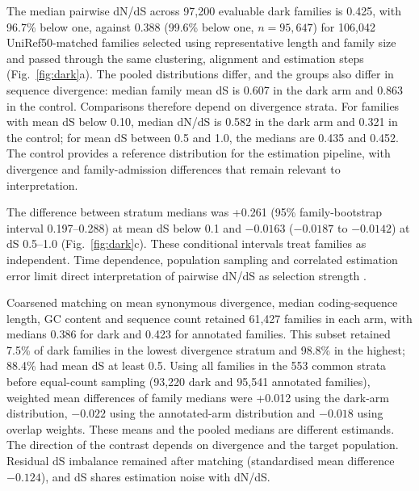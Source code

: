 \documentclass[11pt]{article}
\begin{document}
The median pairwise dN/dS across 97{,}200 evaluable dark families is 0.425, with 96.7\%
below one, against 0.388 (99.6\% below one, $n = 95{,}647$) for 106{,}042 UniRef50-matched families
selected using representative length and family size and passed through the same clustering,
alignment and estimation steps (Fig.~\ref{fig:dark}a). The pooled distributions differ, and the groups also differ in sequence divergence: median
family mean dS is 0.607 in the dark arm and 0.863 in the control. Comparisons therefore depend
on divergence strata. For families with mean dS below 0.10, median dN/dS is 0.582 in the dark
arm and 0.321 in the control; for mean dS between 0.5 and 1.0, the medians are 0.435 and 0.452.
The control provides a reference distribution for the estimation pipeline, with divergence and
family-admission differences that remain relevant to interpretation.

The difference between stratum medians was +0.261 (95\% family-bootstrap interval
0.197--0.288) at mean dS below 0.1 and $-0.0163$ ($-0.0187$ to $-0.0142$) at dS 0.5--1.0
(Fig.~\ref{fig:dark}c). These conditional intervals treat families as independent.
Time dependence, population sampling and correlated estimation error limit direct interpretation
of pairwise dN/dS as selection strength \citep{kryazhimskiy2008dnds,mugal2014time}.

Coarsened matching on mean synonymous divergence, median coding-sequence length, GC content
and sequence count retained 61{,}427 families in each arm, with medians 0.386 for dark and 0.423 for annotated families.
This subset retained 7.5\% of dark families in the lowest divergence stratum and 98.8\% in
the highest; 88.4\% had mean dS at least 0.5. Using all families in the 553 common strata before equal-count sampling
(93{,}220 dark and 95{,}541 annotated families), weighted mean differences of family medians were +0.012 using the dark-arm distribution,
$-0.022$ using the annotated-arm distribution and $-0.018$ using overlap weights.
These means and the pooled medians are different estimands. The direction of the contrast
depends on divergence and the target population. Residual dS imbalance remained after matching
(standardised mean difference $-0.124$), and dS shares estimation noise with dN/dS.
\end{document}
